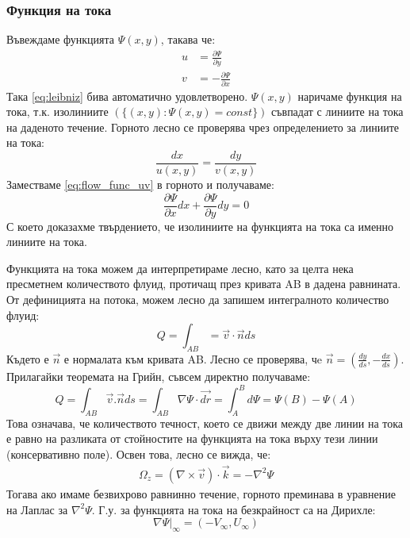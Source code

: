 \subsubsection{Функция на тока}
Въвеждаме функцията $\Psi(x,y)$, такава че:
\begin{align}
	\label{eq:flow_func_uv}
	u & = \frac{\partial \Psi}{\partial y}            \\
	v & = -\frac{\partial \Psi}{\partial x} \nonumber
\end{align}
Така \autoref{eq:leibniz} бива автоматично удовлетворено. $\Psi(x,y)$ наричаме функция на тока, т.к. изолиниите $\left(\{(x,y): \Psi(x,y) = const\}\right)$ съвпадат с линиите на тока на даденото течение.
Горното лесно се проверява чрез определението за линиите на тока:
\begin{equation*}
	\frac{dx}{u(x,y)} = \frac{dy}{v(x,y)}
\end{equation*}
Заместваме \autoref{eq:flow_func_uv} в горното и получаваме:
\begin{equation*}
	\frac{\partial \Psi}{\partial x} d x + \frac{\partial \Psi}{\partial y} d y = 0
\end{equation*}
С което доказахме твърдението, че изолиниите на функцията на тока са именно линиите на тока.

Функцията на тока можем да интерпретираме лесно, като за целта нека пресметнем количеството флуид, протичащ през кривата AB в дадена равнината. От дефиницията на потока, можем лесно да запишем интегралното количество флуид:
\begin{equation*}
	Q = \int_{AB} = \vec{v} \cdot \vec{n} ds
\end{equation*}
Където е $\vec{n}$ е нормалата към кривата AB. Лесно се проверява, чe $\vec{n} = (\frac{dy}{ds}, -\frac{d x}{d s})$. Прилагайки теоремата на Грийн, съвсем директно получаваме:
\begin{equation}
	Q = \int_{AB} \vec{v}.\vec{n} ds = \int_{AB} \nabla \Psi \cdot \vec{dr} = \int_{A}^{B} d \Psi = \Psi(B) - \Psi(A)
\end{equation}
Това означава, че количеството течност, което се движи между две линии на тока е равно на разликата от стойностите на функцията на тока върху тези линии (консервативно поле).
Освен това, лесно се вижда, че:
\begin{align*}
	\Omega_z = (\nabla \times \vec{v}) \cdot \vec{k} = - \nabla^2 \Psi
\end{align*}
Тогава ако имаме безвихрово равнинно течение, горното преминава в уравнение на Лаплас за $\nabla^2 \Psi$.
Г.у. за функцията на тока на безкрайност са на Дирихле:
\begin{equation*}
	\nabla \Psi \big|_\infty = (-V_\infty, U_\infty)
\end{equation*}

